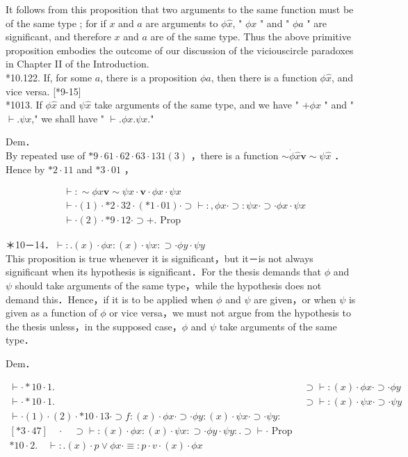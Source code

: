 \documentclass[10pt]{article}
\begin{document}
It follows from this proposition that two arguments to the same function must be of the same type ; for if $x$ and $a$ are arguments to $\phi \hat{x}$, " $\phi x$ " and " $\phi a$ " are significant, and therefore $x$ and $a$ are of the same type. Thus the above primitive proposition embodies the outcome of our discussion of the viciouscircle paradoxes in Chapter II of the Introduction.\\
*10.122. If, for some $a$, there is a proposition $\phi a$, then there is a function $\phi \hat{x}$, and vice versa. [*9-15]\\
*1013. If $\phi \hat{x}$ and $\psi \hat{x}$ take arguments of the same type, and we have " $+\phi x$ " and " $\vdash . \psi x$," we shall have " $\vdash . \phi x . \psi x$."

Dem．\\
By repeated use of $* 9 \cdot 61 \cdot 62 \cdot 63 \cdot 131(3)$ ，there is a function $\sim \dot{\phi} \hat{x} \mathbf{v} \sim \psi \hat{x}$ ． Hence by $* 2 \cdot 11$ and $* 3 \cdot 01$ ，


\begin{align*}
& \vdash: \sim \phi x \mathbf{v} \sim \psi x \cdot \mathbf{v} \cdot \phi x \cdot \psi x  \tag{1}\\
& \vdash \cdot(1) \cdot * 2 \cdot 32 \cdot(* 1 \cdot 01) \cdot \supset \vdash:, \phi x \cdot \supset: \psi x \cdot \supset \cdot \phi x \cdot \psi x  \tag{2}\\
& \vdash \cdot(2) \cdot * 9 \cdot 12 \cdot \supset+. \text { Prop }
\end{align*}


＊10－14．$\vdash: .(x) \cdot \phi x:(x) \cdot \psi x: \supset \cdot \phi y \cdot \psi y$\\
This proposition is true whenever it is significant，but it－is not always significant when its hypothesis is significant．For the thesis demands that $\phi$ and $\psi$ should take arguments of the same type，while the hypothesis does not demand this．Hence，if it is to be applied when $\phi$ and $\psi$ are given，or when $\psi$ is given as a function of $\phi$ or vice versa，we must not argue from the hypothesis to the thesis unless，in the supposed case，$\phi$ and $\psi$ take arguments of the same type．

Dem．

\[
\begin{array}{ll}
\vdash \cdot * 10 \cdot 1 . & \supset \vdash:(x) \cdot \phi x \cdot \supset \cdot \phi y \\
\vdash \cdot * 10 \cdot 1 . & \supset \vdash:(x) \cdot \psi x \cdot \supset \cdot \psi y  \tag{2}\\
\vdash \cdot(1) \cdot(2) \cdot * 10 \cdot 13 \cdot \supset f:(x) \cdot \phi x \cdot \supset \cdot \phi y:(x) \cdot \psi x \cdot \supset \cdot \psi y: \\
{[* 3 \cdot 47] \quad \cdot \quad \supset \vdash:(x) \cdot \phi x:(x) \cdot \psi x: \supset \cdot \phi y \cdot \psi y: . \supset \vdash \cdot \text { Prop }} \\
* 10 \cdot 2 . \quad \vdash: .(x) \cdot p \vee \phi x \cdot \equiv: p \cdot v \cdot(x) \cdot \phi x
\end{array}
\]
\end{document}
